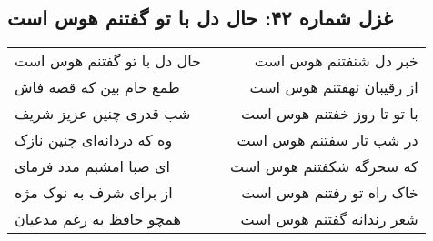 \begin{center}
\section*{غزل شماره ۴۲: حال دل با تو گفتنم هوس است}
\label{sec:sh042}
\begin{longtable}{l p{0.5cm} r}
حال دل با تو گفتنم هوس است
&&
خبر دل شنفتنم هوس است
\\
طمع خام بین که قصه فاش
&&
از رقیبان نهفتنم هوس است
\\
شب قدری چنین عزیز شریف
&&
با تو تا روز خفتنم هوس است
\\
وه که دردانه‌ای چنین نازک
&&
در شب تار سفتنم هوس است
\\
ای صبا امشبم مدد فرمای
&&
که سحرگه شکفتنم هوس است
\\
از برای شرف به نوک مژه
&&
خاک راه تو رفتنم هوس است
\\
همچو حافظ به رغم مدعیان
&&
شعر رندانه گفتنم هوس است
\\
\end{longtable}
\end{center}
